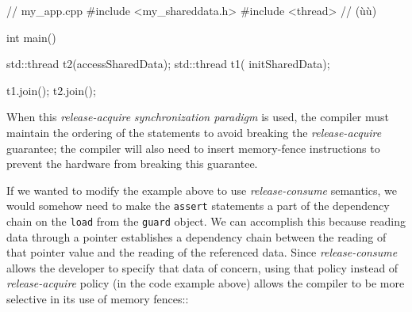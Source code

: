 \newpage%
\begin{emcppslisting}
// my_app.cpp
#include <my_shareddata.h>
#include <thread>  // (ù{}ù)

int main()
{
    std::thread t2(accessSharedData);
    std::thread t1(  initSharedData);

    t1.join();
    t2.join();
}
\end{emcppslisting}
    
\noindent When this \emph{release-acquire} \emph{synchronization paradigm} is
used, the compiler must maintain the ordering of the statements to avoid
breaking the \emph{release-acquire} guarantee; the compiler will also
need to insert memory-fence instructions to prevent the hardware from
breaking this guarantee.

If we wanted to modify the example above to use \emph{release-consume}
semantics, we would somehow need to make the \lstinline!assert! statements
a part of the dependency chain on the \lstinline!load! from the
\lstinline!guard! object. We can accomplish this because reading data
through a pointer establishes a dependency chain between the reading of
that pointer value and the reading of the referenced data.  Since \emph{release-consume} allows the developer to specify that data of concern, using that policy instead of \emph{release-acquire} policy (in the code example above) allows the compiler to be more selective in its use of memory fences::


